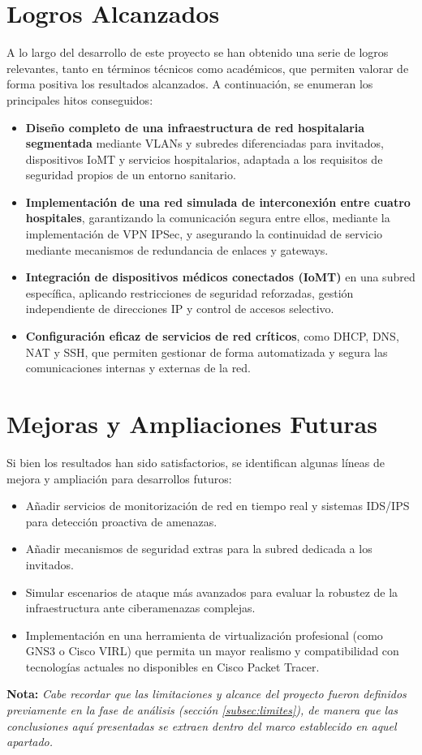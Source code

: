 \section{Logros Alcanzados}
A lo largo del desarrollo de este proyecto se han obtenido una serie de logros relevantes, tanto en términos técnicos como académicos, que permiten valorar de forma positiva 
los resultados alcanzados. A continuación, se enumeran los principales hitos conseguidos:
\begin{itemize}
    \item \textbf{Diseño completo de una infraestructura de red hospitalaria segmentada} mediante VLANs y subredes diferenciadas para invitados, dispositivos IoMT y servicios hospitalarios, adaptada a los requisitos de seguridad propios de un entorno sanitario.
    \item \textbf{Implementación de una red simulada de interconexión entre cuatro hospitales}, garantizando la comunicación segura entre ellos, mediante la implementación de VPN IPSec, y asegurando la continuidad de servicio mediante mecanismos de redundancia de enlaces y gateways.
    \item \textbf{Integración de dispositivos médicos conectados (IoMT)} en una subred específica, aplicando restricciones de seguridad reforzadas, gestión independiente de direcciones IP y control de accesos selectivo.
    \item \textbf{Configuración eficaz de servicios de red críticos}, como DHCP, DNS, NAT y SSH, que permiten gestionar de forma automatizada y segura las comunicaciones internas y externas de la red.
\end{itemize}
\section{Mejoras y Ampliaciones Futuras}
Si bien los resultados han sido satisfactorios, se identifican algunas líneas de mejora y ampliación para desarrollos futuros:

\begin{itemize}
    \item Añadir servicios de monitorización de red en tiempo real y sistemas IDS/IPS para detección proactiva de amenazas.
    \item Añadir mecanismos de seguridad extras para la subred dedicada a los invitados.
    \item Simular escenarios de ataque más avanzados para evaluar la robustez de la infraestructura ante ciberamenazas complejas.
    \item Implementación en una herramienta de virtualización profesional (como GNS3 o Cisco VIRL) que permita un mayor realismo y 
    compatibilidad con tecnologías actuales no disponibles en Cisco Packet Tracer.

\end{itemize}
\small{\textbf{Nota:}\textit{ Cabe recordar que las limitaciones y alcance del proyecto fueron definidos previamente en la fase de análisis (sección \ref{subsec:limites}), de manera que las conclusiones aquí presentadas se extraen dentro del marco establecido en aquel apartado.}}





